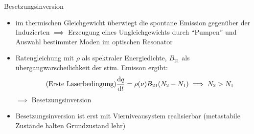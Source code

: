 \documentclass[10pt, aspectratio=169]{beamer}
\begin{document}
\begin{frame}{Besetzungsinversion}
  \begin{itemize}
  \item<1-> im thermischen Gleichgewicht \"uberwiegt die spontane
    Emission gegen\"uber der Induzierten \(\implies\) Erzeugung eines
    Ungleichgewichts durch ``Pumpen''  und Auswahl bestimmter Moden im optischen
    Resonator 
  \item<2-> Ratengleichung mit \(\rho\) als spektraler Energiedichte,
    \(B_{21}\) als \"ubergangwarscheilichkeit der
    stim. Emisson ergibt:
    \begin{equation}
      \label{eq:firstlaser}\tag{Erste Laserbedingung}
      \dv{q}{t}=\rho(\nu)B_{21}(N_2-N_1) \implies
      N_2>N_1
    \end{equation}
    \(\implies\) Besetzungsinversion
  \item<3-> Besetzungsinversion ist erst mit Vierniveausystem
    realisierbar (metastabile Zust\"ande halten Grundzustand
    lehr)
  \end{itemize}
\end{frame}
\end{document}
